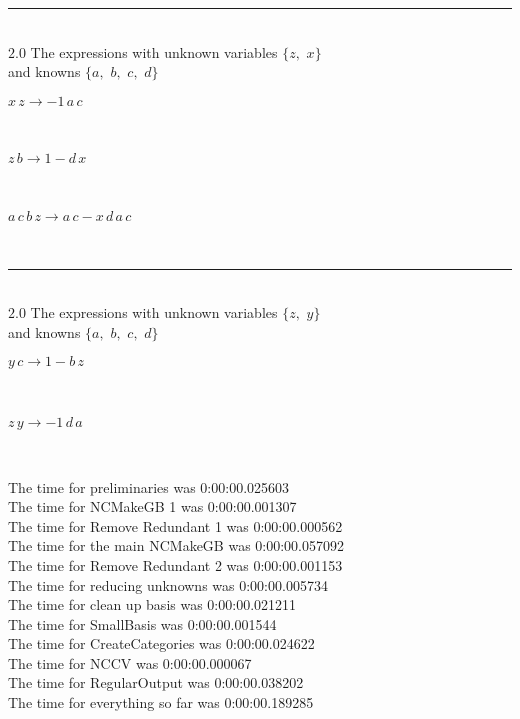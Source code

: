 \documentclass[rep10,leqno]{report}
\begin{document}
\rule[3pt]{6in}{.7pt}\\
$2.0$  The expressions with unknown variables $\{z,
$ $
x\}$\\
and knowns $\{a,
$ $
b,
$ $
c,
$ $
d\}$\smallskip\\
\begin{minipage}{6in}
$
x\,
 z\rightarrow -1\,
 a\,
 c
$
\end{minipage}\medskip \\
\begin{minipage}{6in}
$
z\,
 b\rightarrow 1 - d\,
 x
$
\end{minipage}\medskip \\
\begin{minipage}{6in}
$
a\,
 c\,
 b\,
 z\rightarrow a\,
 c - x\,
 d\,
 a\,
 c
$
\end{minipage}\\
\rule[3pt]{6in}{.7pt}\\
$2.0$  The expressions with unknown variables $\{z,
$ $
y\}$\\
and knowns $\{a,
$ $
b,
$ $
c,
$ $
d\}$\smallskip\\
\begin{minipage}{6in}
$
y\,
 c\rightarrow 1 - b\,
 z
$
\end{minipage}\medskip \\
\begin{minipage}{6in}
$
z\,
 y\rightarrow -1\,
 d\,
 a
$
\end{minipage}\\
\vspace{10pt}

\noindent
The time for preliminaries was 0:00:00.025603\\
The time for NCMakeGB 1 was 0:00:00.001307\\
The time for Remove Redundant 1 was 0:00:00.000562\\
The time for the main NCMakeGB was 0:00:00.057092\\
The time for Remove Redundant 2 was 0:00:00.001153\\
The time for reducing unknowns was 0:00:00.005734\\
The time for clean up basis was 0:00:00.021211\\
The time for SmallBasis was 0:00:00.001544\\
The time for CreateCategories was 0:00:00.024622\\
The time for NCCV was 0:00:00.000067\\
The time for RegularOutput was 0:00:00.038202\\
The time for everything so far was 0:00:00.189285\\
\end{document}
